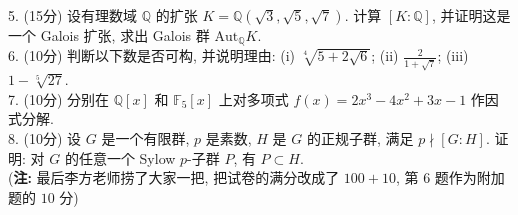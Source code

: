 \documentclass[UTF8]{ctexart}
\begin{document}
5. (15分) 设有理数域 $\mathbb{Q}$ 的扩张 $K=\mathbb{Q}(\sqrt{3},\sqrt{5},\sqrt{7})$. 计算 $[K:\mathbb{Q}]$, 并证明这是一个 Galois 扩张, 求出 Galois 群 $\text{Aut}_{\mathbb{Q}}K$.
\\

6. (10分) 判断以下数是否可构, 并说明理由: (i) $\sqrt[4]{5+2\sqrt{6}}$; (ii) $\displaystyle\frac{2}{1+\sqrt{7}}$; (iii) $1-\sqrt[5]{27}$.
\\

7. (10分) 分别在 $\mathbb{Q}[x]$ 和 $\mathbb{F}_5[x]$ 上对多项式 $f(x)=2x^3-4x^2+3x-1$ 作因式分解.
\\

8. (10分) 设 $G$ 是一个有限群, $p$ 是素数, $H$ 是 $G$ 的正规子群, 满足 $p\nmid[G:H]$. 证明: 对 $G$ 的任意一个 Sylow $p$-子群 $P$, 有 $P\subset H$.
\\

(\textbf{注:} 最后李方老师捞了大家一把, 把试卷的满分改成了 $100+10$, 第 $6$ 题作为附加题的 $10$ 分)
\end{document}
